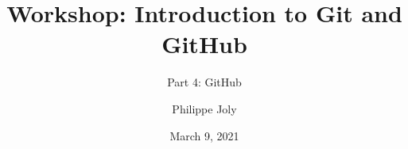 \documentclass[handout]{beamer}
\title[Git/GitHub Workshop: Part 4]{Workshop: Introduction to Git and GitHub}
\subtitle{Part 4: GitHub}
\author[P. Joly]{Philippe Joly}
\institute[FU-Berlin]{Freie Universität Berlin}
\date{March 9, 2021}
\begin{document}
\begin{frame}
\titlepage
\end{frame}
%

%
%



\end{document}
